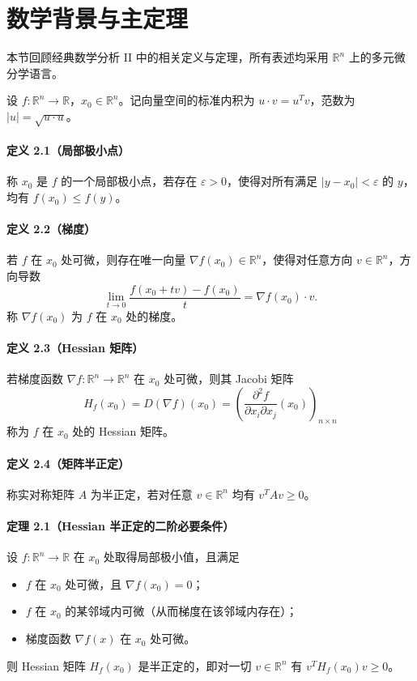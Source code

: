 ﻿\documentclass[UTF8,a4paper,zihao=-4]{ctexart}
\begin{document}
\section{数学背景与主定理}
本节回顾经典数学分析 II 中的相关定义与定理，所有表述均采用 \(\mathbb{R}^n\) 上的多元微分学语言。

设 \(f:\mathbb{R}^n\to\mathbb{R}\)，\(x_0\in\mathbb{R}^n\)。记向量空间的标准内积为 \(u\cdot v=u^T v\)，范数为 \(|u|=\sqrt{u\cdot u}\)。

\paragraph{定义 2.1（局部极小点）}称 \(x_0\) 是 \(f\) 的一个局部极小点，若存在 \(\varepsilon>0\)，使得对所有满足 \(|y-x_0|<\varepsilon\) 的 \(y\)，均有 \(f(x_0)\le f(y)\)。

\paragraph{定义 2.2（梯度）}若 \(f\) 在 \(x_0\) 处可微，则存在唯一向量 \(\nabla f(x_0)\in\mathbb{R}^n\)，使得对任意方向 \(v\in\mathbb{R}^n\)，方向导数
\[
\lim_{t\to0}\frac{f(x_0+tv)-f(x_0)}{t} = \nabla f(x_0)\cdot v .
\]
称 \(\nabla f(x_0)\) 为 \(f\) 在 \(x_0\) 处的梯度。

\paragraph{定义 2.3（Hessian 矩阵）}若梯度函数 \(\nabla f:\mathbb{R}^n\to\mathbb{R}^n\) 在 \(x_0\) 处可微，则其 Jacobi 矩阵
\[
H_f(x_0) = D(\nabla f)(x_0) = \left(\frac{\partial^2 f}{\partial x_i\partial x_j}(x_0)\right)_{n\times n}
\]
称为 \(f\) 在 \(x_0\) 处的 Hessian 矩阵。

\paragraph{定义 2.4（矩阵半正定）}称实对称矩阵 \(A\) 为半正定，若对任意 \(v\in\mathbb{R}^n\) 均有 \(v^T A v \ge 0\)。

\paragraph{定理 2.1（Hessian 半正定的二阶必要条件）}设 \(f:\mathbb{R}^n\to\mathbb{R}\) 在 \(x_0\) 处取得局部极小值，且满足
\begin{itemize}
\item \(f\) 在 \(x_0\) 处可微，且 \(\nabla f(x_0)=0\)；
\item \(f\) 在 \(x_0\) 的某邻域内可微（从而梯度在该邻域内存在）；
\item 梯度函数 \(\nabla f(x)\) 在 \(x_0\) 处可微。
\end{itemize}
则 Hessian 矩阵 \(H_f(x_0)\) 是半正定的，即对一切 \(v\in\mathbb{R}^n\) 有 \(v^T H_f(x_0) v \ge 0\)。
\end{document}
